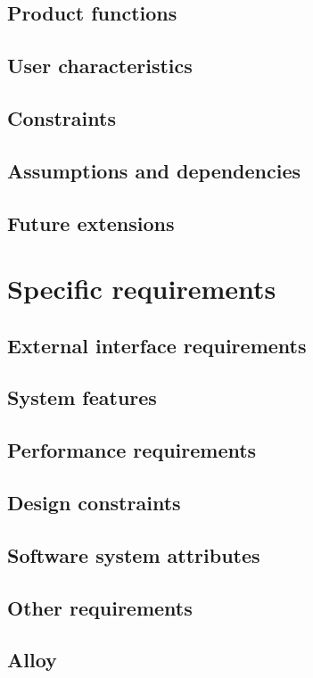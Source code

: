 \documentclass[12pt, a4paper]{report}
\begin{document}
\section{Product functions}


\section{User characteristics}


\section{Constraints}


\section{Assumptions and dependencies}


\section{Future extensions}


\chapter{Specific requirements}
\label{ch:requirements}

\section{External interface requirements}


\section{System features}


\section{Performance requirements}


\section{Design constraints}


\section{Software system attributes}


\section{Other requirements}


\section{Alloy}



\end{document}
